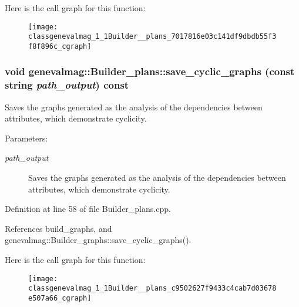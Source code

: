 Here is the call graph for this function:\nopagebreak
\begin{figure}[H]
\begin{center}
\leavevmode
\texttt{[image: classgenevalmag\_1\_1Builder\_\_plans\_7017816e03c141df9dbdb55f3f8f896c\_cgraph]}
\end{center}
\end{figure}
\hypertarget{classgenevalmag_1_1Builder__plans_c9502627f9433c4cab7d03678e507a66}{
\subsubsection[{save\_\-cyclic\_\-graphs}]{\setlength{\rightskip}{0pt plus 5cm}void genevalmag::Builder\_\-plans::save\_\-cyclic\_\-graphs (const string {\em path\_\-output}) const}}
\label{classgenevalmag_1_1Builder__plans_c9502627f9433c4cab7d03678e507a66}


Saves the graphs generated as the analysis of the dependencies between attributes, which demonstrate cyclicity. \begin{Desc}
\item[Parameters:]
\begin{description}
\item[{\em path\_\-output}]Saves the graphs generated as the analysis of the dependencies between attributes, which demonstrate cyclicity. \end{description}
\end{Desc}


Definition at line 58 of file Builder\_\-plans.cpp.

References build\_\-graphs, and genevalmag::Builder\_\-graphs::save\_\-cyclic\_\-graphs().

Here is the call graph for this function:\nopagebreak
\begin{figure}[H]
\begin{center}
\leavevmode
\texttt{[image: classgenevalmag\_1\_1Builder\_\_plans\_c9502627f9433c4cab7d03678e507a66\_cgraph]}
\end{center}
\end{figure}


